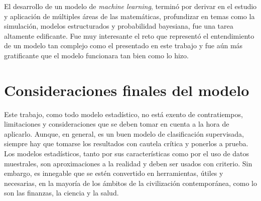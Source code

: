\documentclass[../Main/Main.tex]{subfiles}
\begin{document}
El desarrollo de un modelo de \textit{machine learning}, terminó por  derivar en el estudio y aplicación de múltiples áreas de las matemáticas, profundizar en temas como la simulación, modelos estructurados y probabilidad bayesiana, fue una tarea altamente edificante. Fue muy interesante el reto que representó el entendimiento de un modelo tan complejo como el presentado en este trabajo y fue aún más gratificante que el modelo funcionara tan bien como lo hizo. 

\section{Consideraciones finales del modelo}
Este trabajo, como todo modelo estadístico, no está exento de contratiempos, limitaciones y consideraciones que se deben tomar en cuenta a la hora de aplicarlo. Aunque, en general, es un buen modelo de clasificación supervisada, siempre hay que tomarse los resultados con cautela crítica y ponerlos a prueba. Los modelos estadísticos, tanto por sus características como por el uso de datos muestrales, son aproximaciones a la realidad y deben ser usados con criterio. Sin embargo, es innegable que se estén convertido en herramientas, útiles y necesarias, en la mayoría de los ámbitos de la civilización contemporánea, como lo son las finanzas, la ciencia y la salud.
\end{document}
